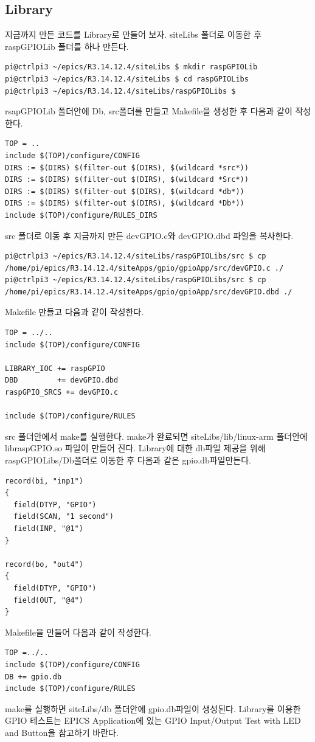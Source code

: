 \documentclass[11pt
  , a4paper
  , article
  , oneside
]{memoir}
\begin{document}
\subsection{Library}
지금까지 만든 코드를 Library로 만들어 보자.
siteLibs 폴더로 이동한 후 raspGPIOLib 폴더를 하나 만든다.
\begin{lstlisting}[style=termstyle]
pi@ctrlpi3 ~/epics/R3.14.12.4/siteLibs $ mkdir raspGPIOLib
pi@ctrlpi3 ~/epics/R3.14.12.4/siteLibs $ cd raspGPIOLibs
pi@ctrlpi3 ~/epics/R3.14.12.4/siteLibs/raspGPIOLibs $
\end{lstlisting}
rsapGPIOLib 폴더안에 Db, src폴더를 만들고 Makefile을 생성한 후 다음과 같이 작성한다.
\begin{lstlisting}[style=termstyle]
TOP = ..
include $(TOP)/configure/CONFIG
DIRS := $(DIRS) $(filter-out $(DIRS), $(wildcard *src*))
DIRS := $(DIRS) $(filter-out $(DIRS), $(wildcard *Src*))
DIRS := $(DIRS) $(filter-out $(DIRS), $(wildcard *db*))
DIRS := $(DIRS) $(filter-out $(DIRS), $(wildcard *Db*))
include $(TOP)/configure/RULES_DIRS
\end{lstlisting}
src 폴더로 이동 후 지금까지 만든 devGPIO.c와 devGPIO.dbd 파일을 복사한다.
\begin{lstlisting}[style=termstyle]
pi@ctrlpi3 ~/epics/R3.14.12.4/siteLibs/raspGPIOLibs/src $ cp /home/pi/epics/R3.14.12.4/siteApps/gpio/gpioApp/src/devGPIO.c ./
pi@ctrlpi3 ~/epics/R3.14.12.4/siteLibs/raspGPIOLibs/src $ cp /home/pi/epics/R3.14.12.4/siteApps/gpio/gpioApp/src/devGPIO.dbd ./
\end{lstlisting}
Makefile 만들고 다음과 같이 작성한다.
\begin{lstlisting}[style=termstyle]
TOP = ../..
include $(TOP)/configure/CONFIG

LIBRARY_IOC += raspGPIO
DBD         += devGPIO.dbd
raspGPIO_SRCS += devGPIO.c

include $(TOP)/configure/RULES
\end{lstlisting}
 src 폴더안에서 make를 실행한다. make가 완료되면 siteLibs/lib/linux-arm 폴더안에 libraspGPIO.so 파일이 
만들어 진다. Library에 대한 db파일 제공을 위해 raspGPIOLibs/Db폴더로 이동한 후 다음과 같은 
gpio.db파일만든다.
\begin{lstlisting}[style=termstyle]
record(bi, "inp1")
{
  field(DTYP, "GPIO")
  field(SCAN, "1 second")
  field(INP, "@1")
}

record(bo, "out4")
{
  field(DTYP, "GPIO")
  field(OUT, "@4")
}
\end{lstlisting}
Makefile을 만들어 다음과 같이 작성한다.
\begin{lstlisting}[style=termstyle]
TOP =../..
include $(TOP)/configure/CONFIG
DB += gpio.db
include $(TOP)/configure/RULES
\end{lstlisting}
make를 실행하면 siteLibs/db 폴더안에 gpio.db파일이 생성된다.
Library를 이용한 GPIO 테스트는 EPICS Application에 있는 GPIO Input/Output Test with LED and 
Button을 참고하기 바란다.
\end{document}
